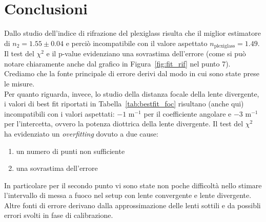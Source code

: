 \documentclass[a4paper,12pt]{article}
\begin{document}
\section{Conclusioni}

Dallo studio dell'indice di rifrazione del plexiglass risulta che il miglior estimatore di $n_2 = 1.55 \pm 0.04$ e perciò incompatibile con il valore aspettato $n_{\text{plexiglass}} = 1.49$. Il test del $\chi^2$ e il p-value evidenziano una sovrastima dell'errore (come si può notare chiaramente anche dal grafico in Figura~\ref{fig:fit_rif} nel punto 7).
Crediamo che la fonte principale di errore derivi dal modo in cui sono state prese le misure.\\

Per quanto riguarda, invece, lo studio della distanza focale della lente divergente, i valori di best fit riportati in Tabella~\ref{tab:bestfit_foc} risultano (anche qui) incompatibili con i valori aspettati: $-1$ m$^{-1}$ per il coefficiente angolare e $-3$ m$^{-1}$ per l'intercetta, ovvero la potenza diottrica della lente divergente.
Il test del $\chi^2$ ha evidenziato un \textit{overfitting} dovuto a due cause:

\begin{enumerate}
    \item un numero di punti non sufficiente
    \item una sovrastima dell'errore
\end{enumerate}

In particolare per il secondo punto vi sono state non poche difficoltà nello stimare l'intervallo di messa a fuoco nel setup con lente convergente e lente divergente. %
Altre fonti di errore derivano dalla approssimazione delle lenti sottili e da possibli errori svolti in fase di calibrazione.
\end{document}
